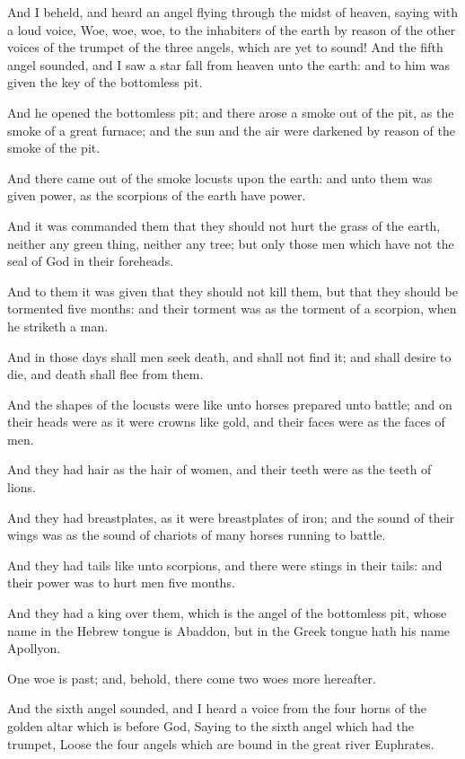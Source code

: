 \Verse And I beheld, and heard an angel flying through the midst of heaven, saying with a loud voice, Woe, woe, woe, to the inhabiters of the earth by reason of the other voices of the trumpet of the three angels, which are yet to sound!  \Chapter \Verse And the fifth angel sounded, and I saw a star fall from heaven unto the earth: and to him was given the key of the bottomless pit.

\Verse And he opened the bottomless pit; and there arose a smoke out of the pit, as the smoke of a great furnace; and the sun and the air were darkened by reason of the smoke of the pit.

\Verse And there came out of the smoke locusts upon the earth: and unto them was given power, as the scorpions of the earth have power.

\Verse And it was commanded them that they should not hurt the grass of the earth, neither any green thing, neither any tree; but only those men which have not the seal of God in their foreheads.

\Verse And to them it was given that they should not kill them, but that they should be tormented five months: and their torment was as the torment of a scorpion, when he striketh a man.

\Verse And in those days shall men seek death, and shall not find it; and shall desire to die, and death shall flee from them.

\Verse And the shapes of the locusts were like unto horses prepared unto battle; and on their heads were as it were crowns like gold, and their faces were as the faces of men.

\Verse And they had hair as the hair of women, and their teeth were as the teeth of lions.

\Verse And they had breastplates, as it were breastplates of iron; and the sound of their wings was as the sound of chariots of many horses running to battle.

\Verse And they had tails like unto scorpions, and there were stings in their tails: and their power was to hurt men five months.

\Verse And they had a king over them, which is the angel of the bottomless pit, whose name in the Hebrew tongue is Abaddon, but in the Greek tongue hath his name Apollyon.

\Verse One woe is past; and, behold, there come two woes more hereafter.

\Verse And the sixth angel sounded, and I heard a voice from the four horns of the golden altar which is before God, \Verse Saying to the sixth angel which had the trumpet, Loose the four angels which are bound in the great river Euphrates.

